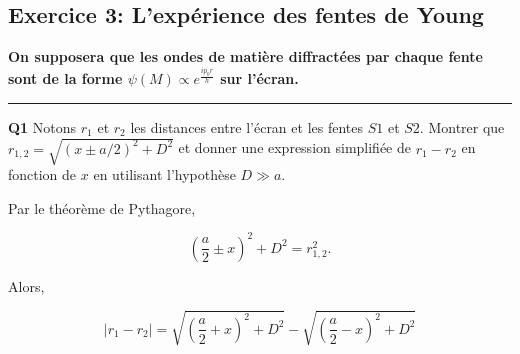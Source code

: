 \documentclass[french]{article}
\begin{document}
	\newpage
	
	\subsection*{Exercice 3: L'expérience des fentes de Young}
	\textbf{On supposera que les ondes de matière diffractées par chaque fente sont de la forme $\psi(M) \propto e^{\frac{ip_0r}{h}}$ sur l'écran.
	}
	\vspace{.3cm}
	\hrule
	\vspace{.3cm}
	{%
		
		\begin{tcolorbox}[colback=gray!5!white,colframe=gray!75!black]
			\textbf{\large{Q1}} Notons $r_1$ et $r_2$ les distances entre l'écran et les fentes $S1$ et $S2$. Montrer que $r_{1,2} = \sqrt{(x \pm a/2)^2 + D^2}$ et donner une expression simplifiée de $r_1 - r_2$ en fonction de $x$ en utilisant l'hypothèse $D \gg a$.
		\end{tcolorbox}
	
		Par le théorème de Pythagore,
		
		\begin{equation}
			\left( \frac{a}{2} \pm x \right)^2 + D^2 = r_{1,2}^2.
		\end{equation}
		
		Alors,
		
		\begin{equation}
			|r_1 - r_2| = \sqrt{\left(\frac{a}{2} + x\right)^2 + D^2} - \sqrt{\left(\frac{a}{2} - x\right)^2 + D^2} 
		\end{equation}
	
	}
	
\end{document}
